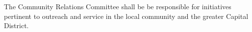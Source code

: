 \item The Community Relations Committee shall be be responsible for initiatives pertinent to outreach and service in the local community and the greater Capital District.
